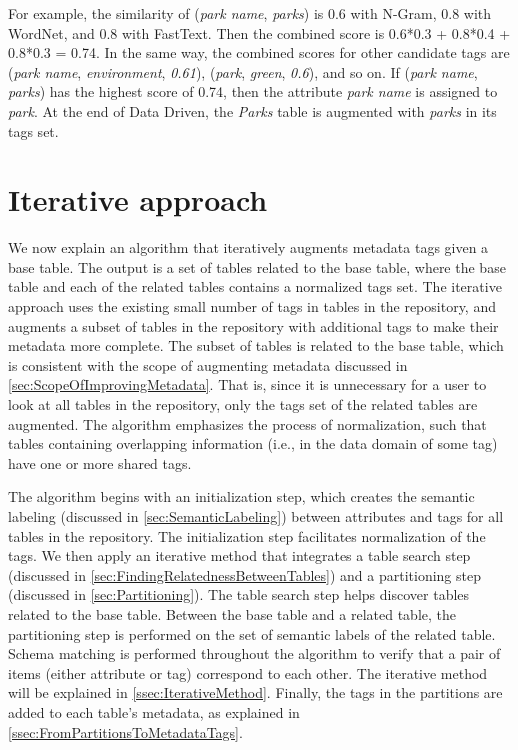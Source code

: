 For example, the similarity of (\textit{park name}, \textit{parks}) is 0.6 with N-Gram, 0.8 with WordNet, and 0.8 with FastText. Then the combined score is 0.6*0.3 + 0.8*0.4 + 0.8*0.3 = 0.74. In the same way, the combined scores for other candidate tags are (\textit{park name}, \textit{environment}, \textit{0.61}), (\textit{park}, \textit{green}, \textit{0.6}), and so on. If (\textit{park name}, \textit{parks}) has the highest score of 0.74, then the attribute \textit{park name} is assigned to \textit{park}. At the end of Data Driven, the \textit{Parks} table is augmented with \textit{parks} in its tags set.

\section{Iterative approach}
\label{sec:IterativeApproach}

We now explain an algorithm that iteratively augments metadata tags given a base table. The output is a set of tables related to the base table, where the base table and each of the related tables contains a normalized tags set. The iterative approach uses the existing small number of tags in tables in the repository, and augments a subset of tables in the repository with additional tags to make their metadata more complete. The subset of tables is related to the base table, which is consistent with the scope of augmenting metadata discussed in \autoref{sec:ScopeOfImprovingMetadata}. That is, since it is unnecessary for a user to look at all tables in the repository, only the tags set of the related tables are augmented. The algorithm emphasizes the process of normalization, such that tables containing overlapping information (i.e., in the data domain of some tag) have one or more shared tags.

The algorithm begins with an initialization step, which creates the semantic labeling (discussed in \autoref{sec:SemanticLabeling}) between attributes and tags for all tables in the repository. The initialization step facilitates normalization of the tags. We then apply an iterative method that integrates a table search step (discussed in \autoref{sec:FindingRelatednessBetweenTables}) and a partitioning step (discussed in \autoref{sec:Partitioning}). The table search step helps discover tables related to the base table. Between the base table and a related table, the partitioning step is performed on the set of semantic labels of the related table. Schema matching is performed throughout the algorithm to verify that a pair of items (either attribute or tag) correspond to each other. The iterative method will be explained in \autoref{ssec:IterativeMethod}. Finally, the tags in the partitions are added to each table's metadata, as explained in \autoref{ssec:FromPartitionsToMetadataTags}.

